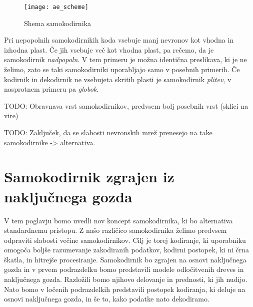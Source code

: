 \documentclass[12pt,a4paper]{article}
\begin{document}
\begin{figure}[h!]

\begin{center}
\texttt{[image: ae\_scheme]}
\end{center}

\caption{Shema samokodirnika}
\end{figure}

Pri nepopolnih samokodirnikih koda vsebuje manj nevronov kot vhodna in izhodna plast. 
Če jih vsebuje več kot vhodna plast, pa rečemo, da je samokodirnik \emph{nadpopoln}. 
V tem primeru je možna identična preslikava, ki je ne želimo, zato se taki samokodirniki uporabljajo samo v posebnih primerih. 
Če kodirnik in dekodirnik ne vsebujeta skritih plasti je samokodirnik \emph{plitev}, v nasprotnem primeru pa \emph{globok}.


TODO: Obravnava vrst samokodirnikov, predvsem bolj posebnih vrst (sklici na vire)

TODO: Zaključek, da se slabosti nevronskih mrež prenesejo na take samokodirnike -> alternativa.




\section{Samokodirnik zgrajen iz naključnega gozda}

V tem poglavju bomo uvedli nov koncept samokodirnika, ki bo alternativa standardnemu pristopu. 
Z našo različico samokodirnika želimo predvsem odpraviti slabosti večine samokodirnikov. 
Cilj je torej kodiranje, ki uporabniku omogoča boljše razumevanje zakodiranih podatkov, kodirni postopek, ki ni črna škatla, in hitrejše procesiranje. 
Samokodirnik bo zgrajen na osnovi naključnega gozda in v prvem podrazdelku bomo predstavili modele odločitvenih dreves in naključnega gozda. 
Razložili bomo njihovo delovanje in prednosti, ki jih nudijo. 
Nato bomo v ločenih podrazdelkih predstavili postopek kodiranja, ki deluje na osnovi naključnega gozda, in še to, kako podatke nato dekodiramo.
\end{document}

